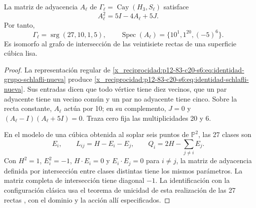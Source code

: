 \begin{theorem}
\label{x_reciprocidad:p12-83-c20-s6:thm:grafo-27-rectas-nuevo}
La matriz de adyacencia \(A_\ell\) de
\(\Gamma_\ell=\operatorname{Cay}(H_3,S_\ell)\) satisface
\begin{equation}
 A_\ell^2=5I-4A_\ell+5J.
 \label{x_reciprocidad:p12-83-c20-s6:eq:identidad-schlafli-nueva}
\end{equation}
Por tanto,
\[
 \Gamma_\ell=\operatorname{srg}(27,10,1,5),
 \qquad
 \operatorname{Spec}(A_\ell)=\{10^1,1^{20},(-5)^6\}.
\]
Es isomorfo al grafo de intersección de las veintisiete rectas de una
superficie cúbica lisa.
\end{theorem}

\begin{proof}
La representación regular de
\cref{x_reciprocidad:p12-83-c20-s6:eq:identidad-grupo-schlafli-nueva} produce
\cref{x_reciprocidad:p12-83-c20-s6:eq:identidad-schlafli-nueva}. Sus entradas dicen que todo vértice
tiene diez vecinos, que un par adyacente tiene un vecino común y un par no
adyacente tiene cinco. Sobre la recta constante, \(A_\ell\) actúa por 10;
en su complemento, \(J=0\) y
\((A_\ell-I)(A_\ell+5I)=0\). Traza cero fija las multiplicidades 20 y 6.

En el modelo de una cúbica obtenida al soplar seis puntos de
\(\mathbb P^2\), las 27 clases son
\[
 E_i,\qquad L_{ij}=H-E_i-E_j,\qquad
 Q_i=2H-\sum_{j\ne i}E_j.
\]
Con \(H^2=1\), \(E_i^2=-1\), \(H\cdot E_i=0\) y
\(E_i\cdot E_j=0\) para \(i\ne j\), la matriz de adyacencia definida
por intersección entre clases distintas tiene los mismos parámetros.
La matriz completa de intersección tiene diagonal \(-1\).
La identificación con la configuración clásica usa el
teorema de unicidad de esta realización de las 27 rectas
\cite{x_reciprocidad:Manivel2005}, con el dominio y la acción allí especificados.
\end{proof}


